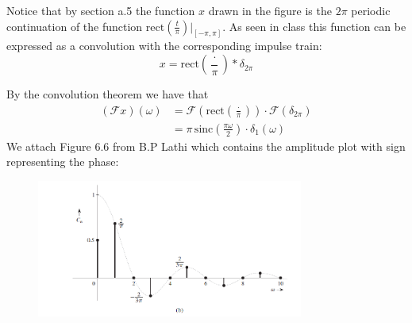 Notice that by section a.5 the function $x$ drawn in the figure is the $2\pi$ periodic continuation of the function $\text{rect}\left(\frac{t}{\pi}\right) \big|_{[-\pi, \pi]}$.
As seen in class this function can be expressed as a convolution with the corresponding impulse train:
\begin{equation}
  x = \text{rect}\left(\frac{\cdot}{\pi}\right) * \delta_{2\pi}
\end{equation}

By the convolution theorem we have that
\begin{equation}
  \begin{aligned}
    \left(\mathcal{F}x\right)(\omega) &= \mathcal{F}\left( \text{rect}\left(\frac{\cdot}{\pi}\right) \right) \cdot \mathcal{F}\left(\delta_{2\pi}\right) \\
    &= \pi \, \text{sinc}\left(\frac{\pi \omega}{2}\right) \cdot \delta_{1}(\omega)
  \end{aligned}
\end{equation}
We attach Figure 6.6 from B.P Lathi which contains the amplitude plot with sign representing the phase:
\begin{figure}[h]
  \centering
  \includegraphics[width=0.78\textwidth]{sampled_sinc.png}
\end{figure}

